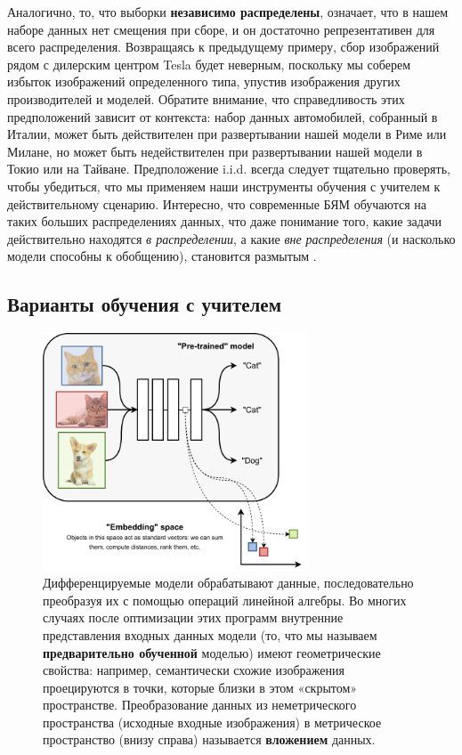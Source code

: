 Аналогично, то, что выборки \textbf{независимо распределены}, означает, что в нашем наборе данных нет смещения при сборе, и он достаточно репрезентативен для всего распределения. Возвращаясь к предыдущему примеру, сбор изображений рядом с дилерским центром Tesla будет неверным, поскольку мы соберем избыток изображений определенного типа, упустив изображения других производителей и моделей. Обратите внимание, что справедливость этих предположений зависит от контекста: набор данных автомобилей, собранный в Италии, может быть действителен при развертывании нашей модели в Риме или Милане, но может быть недействителен при развертывании нашей модели в Токио или на Тайване. Предположение i.i.d. всегда следует тщательно проверять, чтобы убедиться, что мы применяем наши инструменты обучения с учителем к действительному сценарию. Интересно, что современные БЯМ обучаются на таких больших распределениях данных, что даже понимание того, какие задачи действительно находятся \textit{в распределении}, а какие \textit{вне распределения} (и насколько модели способны к обобщению), становится размытым \cite{yuan2024revisiting}.

\subsection{Варианты обучения с учителем}
\label{subsec:variants_supervised_learning}

\begin{figure}[t]
    \centering
    \includegraphics[width=0.7\textwidth]{images/embedding.pdf}
    \caption{Дифференцируемые модели обрабатывают данные, последовательно преобразуя их с помощью операций линейной алгебры. Во многих случаях после оптимизации этих программ внутренние представления входных данных модели (то, что мы называем \textbf{предварительно обученной} моделью) имеют геометрические свойства: например, семантически схожие изображения проецируются в точки, которые близки в этом «скрытом» пространстве. Преобразование данных из неметрического пространства (исходные входные изображения) в метрическое пространство (внизу справа) называется \textbf{вложением} данных.}
    \label{fig:embedding}
\end{figure}

